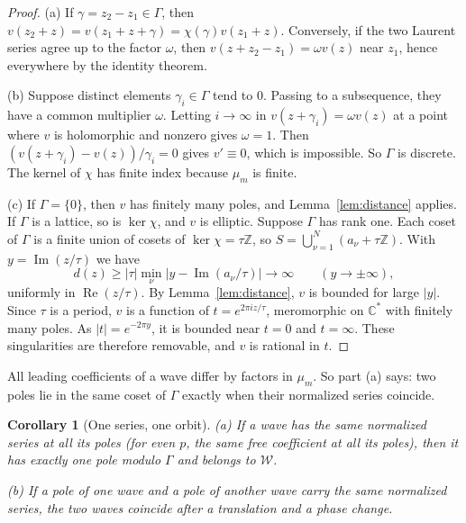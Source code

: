 \documentclass[11pt]{article}
\newtheorem{corollary}[theorem]{Corollary}
\theoremstyle{definition}
\theoremstyle{remark}
\numberwithin{equation}{section}
\newcommand{\CC}{\mathbb C}
\newcommand{\ZZ}{\mathbb Z}
\newcommand{\Wclass}{\mathcal W}
\begin{document}
\begin{proof}
(a) If \(\gamma=z_2-z_1\in\Gamma\), then
\(v(z_2+z)=v(z_1+z+\gamma)=\chi(\gamma)v(z_1+z)\). Conversely, if the
two Laurent series agree up to the factor \(\omega\), then
\(v(z+z_2-z_1)=\omega v(z)\) near \(z_1\), hence everywhere by the
identity theorem.

(b) Suppose distinct elements \(\gamma_i\in\Gamma\) tend to \(0\).
Passing to a subsequence, they have a common multiplier \(\omega\).
Letting \(i\to\infty\) in \(v(z+\gamma_i)=\omega v(z)\) at a point
where \(v\) is holomorphic and nonzero gives \(\omega=1\). Then
\((v(z+\gamma_i)-v(z))/\gamma_i=0\) gives \(v'\equiv0\), which is
impossible. So \(\Gamma\) is discrete. The kernel of \(\chi\) has
finite index because \(\mu_m\) is finite.

(c) If \(\Gamma=\{0\}\), then \(v\) has finitely many poles, and
Lemma~\ref{lem:distance} applies. If \(\Gamma\) is a lattice, so is
\(\ker\chi\), and \(v\) is elliptic. Suppose \(\Gamma\) has rank one.
Each coset of \(\Gamma\) is a finite union of cosets of
\(\ker\chi=\tau\ZZ\), so \(S=\bigcup_{\nu=1}^{N}(a_\nu+\tau\ZZ)\). With
\(y=\operatorname{Im}(z/\tau)\) we have
\[
 d(z)\ge|\tau|\min_\nu\bigl|y-\operatorname{Im}(a_\nu/\tau)\bigr|
 \longrightarrow\infty\qquad(y\to\pm\infty),
\]
uniformly in \(\operatorname{Re}(z/\tau)\). By
Lemma~\ref{lem:distance}, \(v\) is bounded for large \(|y|\). Since
\(\tau\) is a period, \(v\) is a function of \(t=e^{2\pi iz/\tau}\),
meromorphic on \(\CC^*\) with finitely many poles. As
\(|t|=e^{-2\pi y}\), it is bounded near \(t=0\) and \(t=\infty\). These
singularities are therefore removable, and \(v\) is rational in \(t\).
\end{proof}

All leading coefficients of a wave differ by factors in \(\mu_m\). So
part (a) says: two poles lie in the same coset of \(\Gamma\) exactly
when their normalized series coincide.

\begin{corollary}[One series, one orbit]\label{cor:one-germ}
\textup{(a)} If a wave has the same normalized series at all its poles
(for even \(p\), the same free coefficient at all its poles), then it
has exactly one pole modulo \(\Gamma\) and belongs to \(\Wclass\).

\textup{(b)} If a pole of one wave and a pole of another wave carry the
same normalized series, the two waves coincide after a translation and a
phase change.
\end{corollary}
\end{document}
